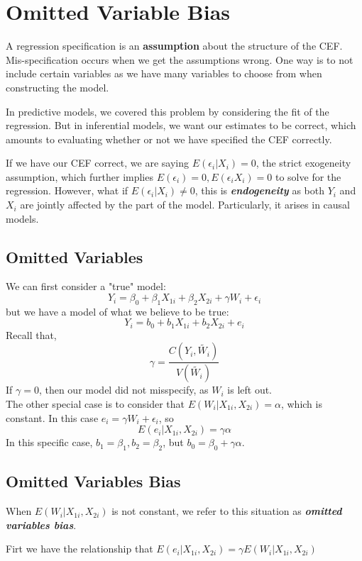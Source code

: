 \section{Omitted Variable Bias}
A regression specification is an \textbf{assumption} about the structure of the CEF. Mis-specification occurs when we get the assumptions wrong. One way is to not include certain variables as we have many variables to choose from when constructing the model.

In predictive models, we covered this problem by considering the fit of the regression. But in inferential models, we want our estimates to be correct, which amounts to evaluating whether or not we have specified the CEF correctly.

If we have our CEF correct, we are saying $E(\epsilon_i | X_i) = 0$, the strict exogeneity assumption, which further implies $E(\epsilon_i) = 0, E(\epsilon_i X_i) = 0$ to solve for the regression. However, what if $E(\epsilon_i | X_i) \ne 0$, this is \textbf{\textit{endogeneity}} as both $Y_i$ and $X_i$ are jointly affected by the part of the model. Particularly, it arises in causal models.

\subsection{Omitted Variables}
We can first consider a "true" model:
$$Y_i = \beta_0 + \beta_1 X_{1i} + \beta_2 X_{2i} + \gamma W_i + \epsilon_i$$
but we have a model of what we believe to be true:
$$Y_i = b_0 + b_1 X_{1i} + b_2 X_{2i} + e_i$$
Recall that,
$$\gamma = \frac{C(Y_i, \tilde{W_i})}{V(\tilde{W_i})}$$
If $\gamma = 0$, then our model did not misspecify, as $W_i$ is left out. \\
The other special case is to consider that $E(W_i | X_{1i}, X_{2i}) = \alpha$, which is constant. In this case $e_i = \gamma W_i + \epsilon_i$, so
$$E(e_i | X_{1i}, X_{2i}) = \gamma \alpha$$
In this specific case, $b_1 = \beta_1, b_2 = \beta_2$, but $b_0 = \beta_0 + \gamma \alpha$.

\subsection{Omitted Variables Bias}
When $E(W_i | X_{1i}, X_{2i})$ is not constant, we refer to this situation as \textbf{\textit{omitted variables bias}}.

Firt we have the relationship that $E(e_i | X_{1i}, X_{2i}) = \gamma E(W_i | X_{1i}, X_{2i})$

